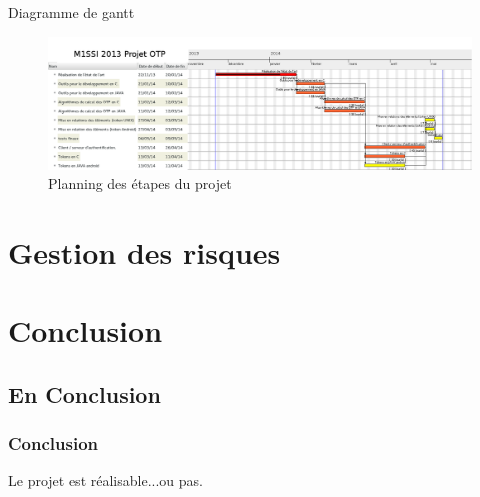 \documentclass{beamer}
\begin{document}
\begin{frame}
  \begin{block}{Diagramme de gantt}
    \begin{figure}
      \includegraphics[scale=0.1]{img/gantt.png} %
      \caption{Planning des étapes du projet}
    \end{figure}
  \end{block}
\end{frame}

\section{Gestion des risques}


\section{Conclusion}

\subsection{En Conclusion}

\begin{frame}
\frametitle{Conclusion}
  Le projet est réalisable...ou pas.
\end{frame}



\end{document}

